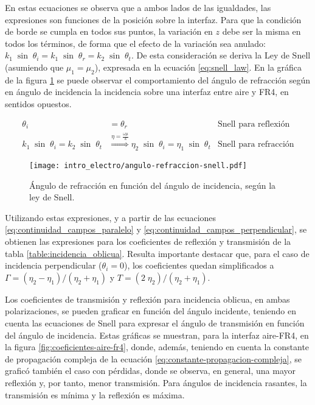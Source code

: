 En estas ecuaciones se observa que a ambos lados de las igualdades, las expresiones son funciones de la posición sobre la interfaz. Para que la condición de borde se cumpla en todos sus puntos, la variación en $z$ debe ser la misma en todos los términos, de forma que el efecto de la variación sea anulado: $k_1 \; \sin\; \theta_i = k_1 \; \sin \; \theta_r = k_2 \; \sin\; \theta_t$.  De esta consideración se deriva la Ley de Snell (asumiendo que $\mu_1 = \mu_2$), expresada en la ecuación \ref{eq:snell_law}. En la gráfica de la figura \ref{fig:ley_snell} se puede observar el comportamiento del ángulo de refracción según en ángulo de incidencia la incidencia sobre una interfaz entre aire y FR4, en sentidos opuestos.

\begin{subequations}
	\label{eq:snell_law}
	\begin{align}
	\theta_i &= \theta_r & \text{Snell para reflexión}\\
	k_1 \; \sin\; \theta_i = k_2 \; \sin\; \theta_t & \overset{\eta=\frac{\omega\mu}{k}}{\Longrightarrow} \eta_2 \; \sin\; \theta_i = \eta_1 \; \sin\; \theta_t & \text{Snell para refracción}\label{eq:snell_law_second}
	\end{align}
\end{subequations}

\begin{figure}[htp]
	\centering
	\texttt{[image: intro\_electro/angulo-refraccion-snell.pdf]}
	\caption{Ángulo de refracción en función del ángulo de incidencia, según la ley de Snell.}
	\label{fig:ley_snell}
\end{figure}

Utilizando estas expresiones, y a partir de las ecuaciones \ref{eq:continuidad_campos_paralelo} y \ref{eq:continuidad_campos_perpendicular}, se obtienen las expresiones para los coeficientes de reflexión y transmisión de la tabla \ref{table:incidencia_oblicua}. Resulta importante destacar que, para el caso de incidencia perpendicular ($\theta_i = 0$), los coeficientes quedan simplificados a $\Gamma = (\eta_2 - \eta_1)/(\eta_2 + \eta_1)$ y $T = (2 \; \eta_2)/(\eta_2 + \eta_1)$.

Los coeficientes de transmisión y reflexión para incidencia oblicua, en ambas polarizaciones, se pueden graficar en función del ángulo incidente, teniendo en cuenta las ecuaciones de Snell para expresar el ángulo de transmisión en función del ángulo de incidencia. Estas gráficas se muestran, para la interfaz aire-FR4, en la figura \ref{fig:coeficientes-aire-fr4}, donde, además,  teniendo en cuenta la constante de propagación compleja de la ecuación \ref{eq:constante-propagacion-compleja}, se graficó también el caso con pérdidas, donde se observa, en general, una mayor reflexión y, por tanto, menor transmisión. Para ángulos de incidencia rasantes, la transmisión es mínima y la reflexión es máxima.

